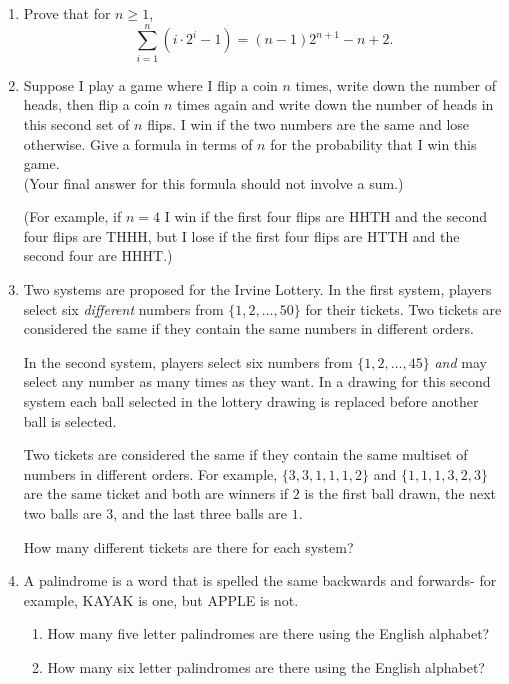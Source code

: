 \documentclass[11pt]{article}
\begin{document}
\begin{enumerate}



\item Prove that for $n\ge 1$,
\[
\sum_{i=1}^n (i \cdot 2^i - 1) = (n-1) 2^{n+1} - n + 2.
\]



\item Suppose I play a game where I flip a coin $n$ times, write down the number of heads, then flip a coin $n$ times again and write down the number of heads in this second set of $n$ flips.  I win if the two numbers are the same and lose otherwise.  Give a formula in terms of $n$ for the probability that I win this game. \\
(Your final answer for this formula should not involve a sum.)

(For example, if $n = 4$ I win if the first four flips are HHTH and the second four flips are THHH, but I lose if the first four flips are HTTH and the second four are HHHT.)



\item Two systems are proposed for the Irvine Lottery.  In the first system, players select six \emph{different} numbers from $\{1,2,\ldots, 50\}$ for their tickets.  Two tickets are considered the same if they contain the same numbers in different orders.

In the second system, players select six numbers from $\{1,2,\ldots, 45\}$ \emph{and} may select any number as many times as they want.  In a drawing for this second system each ball selected in the lottery drawing is replaced before another ball is selected. 

Two tickets are considered the same if they contain the same multiset of numbers in different orders. For example, $\{3,3,1,1,1,2\}$ and $\{1,1,1,3,2,3\}$ are the same ticket and both are winners if $2$ is the first ball drawn, the next two balls are $3$, and the last three balls are $1$.

How many different tickets are there for each system?  



\item A palindrome is a word that is spelled the same backwards and forwards- for example, KAYAK is one, but APPLE is not.
\begin{enumerate}
\item How many five letter palindromes are there using the English alphabet?
\item How many six letter palindromes are there using the English alphabet?
\end{enumerate}






\end{enumerate}
\end{document}
